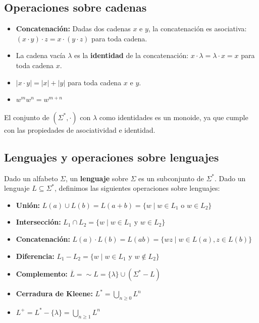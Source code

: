 \subsection{Operaciones sobre cadenas}
\begin{Def}
\begin{itemize}
    \item \textbf{Concatenación:} Dadas dos cadenas $x$ e $y$, la concatenación es asociativa: $(x \cdot y) \cdot z = x \cdot (y \cdot z)$ para toda cadena.
    \item La cadena vacía $\lambda$ es la \textbf{identidad} de la concatenación: $x \cdot \lambda = \lambda \cdot x = x$ para toda cadena $x$.
    \item $|x \cdot y| = |x| + |y|$ para toda cadena $x$ e $y$.
    \item $w^m w^n = w^{m+n}$
\end{itemize}
    El conjunto de $(\Sigma^*, \cdot)$ con $\lambda$ como identidades es un monoide, ya que cumple con las propiedades de asociatividad e identidad.
\end{Def}

\subsection{Lenguajes y operaciones sobre lenguajes}


\begin{Def}

Dado un alfabeto $\Sigma$, un \textbf{lenguaje} sobre $\Sigma$ es un subconjunto de $\Sigma^*$. 
Dado un lenguaje $L \subseteq \Sigma^*$, definimos las siguientes operaciones sobre lenguajes:
\begin{itemize}
    \item \textbf{Unión:} $L(a) \cup L(b) = L(a+b)= \{w \mid w \in L_1 \text{ o } w \in L_2\}$
    \item \textbf{Intersección:} $L_1 \cap L_2 = \{w \mid w \in L_1 \text{ y } w \in L_2\}$
    \item \textbf{Concatenación:} $L(a) \cdot L(b) = L(ab) = \{wz \mid w \in L(a), z \in L(b)\}$
    \item \textbf{Diferencia:} $L_1 - L_2 = \{w \mid w \in L_1 \text{ y } w \notin L_2\}$
    \item \textbf{Complemento:} $\overline{L} = \sim L = \{\lambda\} \cup (\Sigma^* - L)$
    \item \textbf{Cerradura de Kleene:} $L^* = \bigcup_{n \geq 0} L^n$
    \item $L^+ = L^* - \{\lambda\} = \bigcup_{n \geq 1} L^n$
\end{itemize}
\end{Def}

